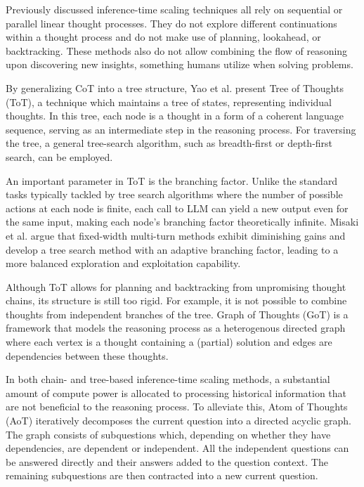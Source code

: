 Previously discussed inference-time scaling techniques all rely on sequential or parallel linear thought processes. 
They do not explore different continuations within a thought process and do not make use of 
planning, lookahead, or backtracking\cite{yao2023treethoughtsdeliberateproblem}. These methods also do not allow 
combining the flow of reasoning upon discovering new insights, something humans utilize when solving problems\cite{Besta_2024}.

By generalizing CoT\cite{wei2023chainofthoughtpromptingelicitsreasoning}\cite{NEURIPS2022_8bb0d291} into a tree structure,
Yao et al.\cite{yao2023treethoughtsdeliberateproblem} present Tree of Thoughts (ToT), a technique which maintains a tree of states, representing individual thoughts.
In this tree, each node is a thought in a form of a coherent language sequence, serving as an intermediate step
in the reasoning process. For traversing the tree, a general tree-search algorithm, such as breadth-first or depth-first search, can be employed.

An important parameter in ToT is the branching factor. Unlike the standard tasks typically tackled by tree search algorithms 
where the number of possible actions at each node is finite, each call to LLM can yield a new output even for 
the same input, making each node's branching factor theoretically infinite\cite{misaki2025widerdeeperscalingllm}.
Misaki et al.\cite{misaki2025widerdeeperscalingllm} argue that fixed-width multi-turn methods exhibit diminishing gains 
and develop a tree search method with an adaptive branching factor, leading to a more balanced exploration and exploitation capability. 

Although ToT allows for planning and backtracking from unpromising thought chains, its structure is still too rigid\cite{Besta_2024}.
For example, it is not possible to combine thoughts from independent branches of the tree. Graph of Thoughts\cite{Besta_2024} (GoT) is 
a framework that models the reasoning process as a heterogenous directed graph where each vertex is a thought containing a (partial) solution
and edges are dependencies between these thoughts\cite{Besta_2024}. 

In both chain- and tree-based inference-time scaling methods, a substantial amount of compute power is allocated to
processing historical information that are not beneficial to the reasoning process. To alleviate this,
Atom of Thoughts\cite{teng2025atomthoughtsmarkovllm} (AoT) iteratively decomposes the current question into a directed acyclic graph.
The graph consists of subquestions which, depending on whether they have dependencies, are dependent or independent.
All the independent questions can be answered directly and their answers added to the question context. 
The remaining subquestions are then contracted into a new current question. 


